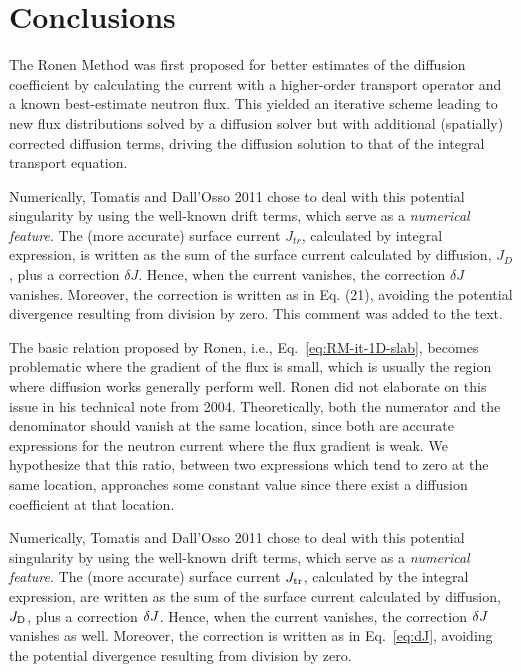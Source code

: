 %
\section{Conclusions}
\label{sec:conc}

The Ronen Method was first proposed for better estimates of the diffusion coefficient by calculating the current with a higher-order transport operator and a known best-estimate neutron flux. This yielded an iterative scheme leading to new flux distributions solved by a diffusion solver but with additional (spatially) corrected diffusion terms, driving the diffusion solution to that of the integral transport equation. %

Numerically, Tomatis and Dall'Osso 2011 chose to deal with this potential singularity by using the well-known drift terms, which serve as a \emph{numerical feature}. The (more accurate) surface current $J_{tr}$, calculated by integral expression, is written as the sum of the surface current calculated by diffusion, $J_D$, plus a correction $\delta J$. Hence, when the current vanishes, the correction $\delta J$ vanishes. Moreover, the correction is written as in Eq. (21), avoiding the potential divergence resulting from division by zero. This comment was added to the text.

The basic relation proposed by Ronen, i.e., Eq.~\eqref{eq:RM-it-1D-slab}, becomes problematic where the gradient of the flux is small, which is usually the region where diffusion works generally perform well. Ronen did not elaborate on this issue in his technical note from 2004. Theoretically, both the numerator and the denominator should vanish at the same location, since both are accurate expressions for the neutron current where the flux gradient is weak. We hypothesize that this ratio, between two expressions which tend to zero at the same location, approaches some constant value since there exist a diffusion coefficient at that location. 

Numerically, Tomatis and Dall'Osso 2011 chose to deal with this potential singularity by using the well-known drift terms, which serve as a \emph{numerical feature}. The (more accurate) surface current $J_{\textrm{\scriptsize{tr}}}$, calculated by the integral expression, are written as the sum of the surface current calculated by diffusion, $J_{\textrm{\scriptsize{D}}}$, plus a correction $\delta J$. Hence, when the current vanishes, the correction $\delta J$ vanishes as well. Moreover, the correction is written as in Eq.~\eqref{eq:dJ}, avoiding the potential divergence resulting from division by zero.

